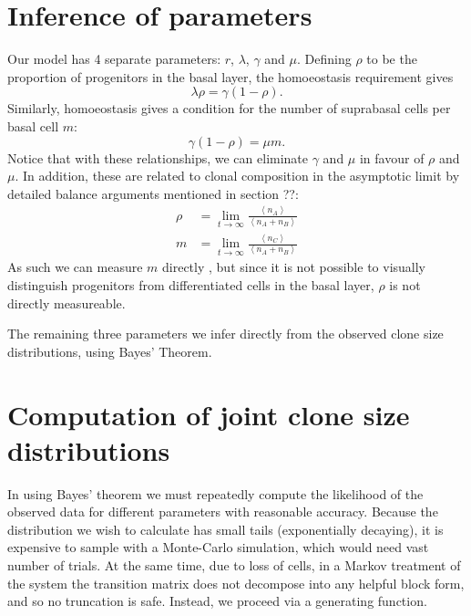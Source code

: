 \documentclass[10pt,UKenglish]{article}
\begin{document}
\section{Inference of parameters}

Our model has 4 separate parameters: $r$, $\lambda$, $\gamma$ and $\mu$.
Defining $\rho$ to be the proportion of progenitors in the basal layer, the
homoeostasis requirement gives $$\lambda \rho = \gamma (1-\rho).$$ Similarly,
homoeostasis gives a condition for the number of suprabasal cells per basal cell
$m$: $$\gamma (1-\rho) = \mu m.$$ Notice that with these relationships, we can
eliminate $\gamma$ and $\mu$ in favour of $\rho$ and $\mu$. In addition, these
are related to clonal composition in the asymptotic limit by detailed balance
arguments mentioned in section ??:
\begin{align*}
\rho &= \lim_{t \rightarrow \infty}\frac{\left\langle n_A \right\rangle}{\left\langle n_A + n_B\right\rangle} \\
m &= \lim_{t \rightarrow \infty}\frac{\left\langle n_C \right\rangle}{\left\langle n_A +n_B\right\rangle}
\end{align*}
As such we can measure $m$ directly , but since it is not possible to visually
distinguish progenitors from differentiated cells in the basal layer, $\rho$ is
not directly measureable.

The remaining three parameters we infer directly from the observed clone size
distributions, using Bayes' Theorem. 

\section{Computation of joint clone size distributions}

In using Bayes' theorem we must repeatedly compute the likelihood of the
observed data for different parameters with reasonable accuracy. Because the
distribution we wish to calculate has small tails (exponentially decaying), it
is expensive to sample with a Monte-Carlo simulation, which would need vast
number of trials. At the same time, due to loss of cells, in a Markov treatment
of the system the transition matrix does not decompose into any helpful block
form, and so no truncation is safe. Instead, we proceed via a generating
function.
\end{document}
